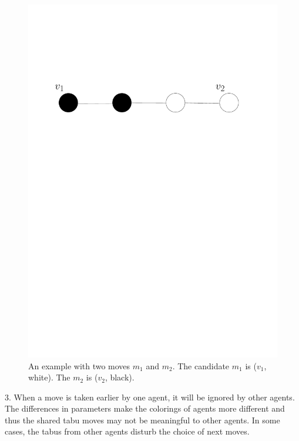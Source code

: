 \documentclass[12pt,a4paper,twoside]{scrartcl}
\numberwithin{equation}{section}
\begin{document}
\begin{figure}[h]
\centering
  \includegraphics[scale = 0.8]{images/1/tabushare.pdf}
      \caption{ An example with two moves $m_1$ and $m_2$. The candidate  $m_1$ is ($v_1$, white). The $m_2$ is ($v_2$, black).}
      \label{Figure tabushare}
\end{figure}

3. When a move is taken earlier by one agent, it will be ignored by other agents. The differences in parameters make the colorings of agents more different and thus the shared tabu moves may not be meaningful to other agents. In some cases, the tabus from other agents disturb the choice of next moves.
\end{document}
